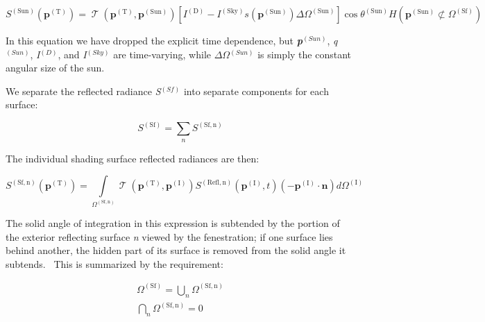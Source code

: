 \begin{equation}
{S^{{\mathrm{(Sun)}}}}({{\mathbf{p}}^{{\mathrm{(T)}}}}) = \operatorname{\mathcal{T}} ({{\mathbf{p}}^{{\mathrm{(T)}}}},{{\mathbf{p}}^{{\mathrm{(Sun)}}}})\left[ {{I^{{\mathrm{(D)}}}} - {I^{{\mathrm{(Sky)}}}}s({{\mathbf{p}}^{{\mathrm{(Sun)}}}})\Delta {\Omega ^{{\mathrm{(Sun)}}}}} \right]\cos {\theta ^{{\mathrm{(Sun)}}}}H\left( {{{\mathbf{p}}^{{\mathrm{(Sun)}}}} \not\subset {\Omega ^{{\mathrm{(Sf)}}}}} \right)
\end{equation}

In this equation we have dropped the explicit time dependence, but \textbf{\emph{p}}\(^{(Sun)}\), \emph{q}\(^{(Sun)}\), \emph{I}\(^{(D)}\), and \emph{I}\(^{(Sky)}\) are time-varying, while \(\Delta\Omega\)\(^{(Sun)}\) is simply the constant angular size of the sun.

We separate the reflected radiance \emph{S}\(^{(Sf)}\) into separate components for each surface:

\begin{equation}
{S^{{\mathrm{(Sf)}}}} = \sum\limits_n {{S^{{\mathrm{(Sf, n)}}}}}
\end{equation}

The individual shading surface reflected radiances are then:

\begin{equation}
{S^{{\mathrm{(Sf, n)}}}}({{\mathbf{p}}^{{\mathrm{(T)}}}}) = \int\limits_{{\Omega ^{{\mathrm{(Sf, n)}}}}} {\operatorname{\mathcal{T}} ({{\mathbf{p}}^{{\mathrm{(T)}}}},{{\mathbf{p}}^{{\mathrm{(I)}}}}){S^{{\mathrm{(Refl, n)}}}}({{\mathbf{p}}^{{\mathrm{(I)}}}},t)\left( { - {{\mathbf{p}}^{{\mathrm{(I)}}}}\cdot {\mathbf{n}}} \right)d{\Omega ^{{\mathrm{(I)}}}}}
\label{eq:SSfnpTEquation}
\end{equation}

The solid angle of integration in this expression is subtended by the portion of the exterior reflecting surface \emph{n} viewed by the fenestration; if one surface lies behind another, the hidden part of its surface is removed from the solid angle it subtends.~ This is summarized by the requirement:

\begin{equation}
\begin{array}{l}{\Omega ^{{\mathrm{(Sf)}}}} = \bigcup\limits_n {{\Omega ^{{\mathrm{(Sf, n)}}}}} \\\bigcap\limits_n {{\Omega ^{{\mathrm{(Sf, n)}}}}}  = 0\end{array}
\end{equation}

